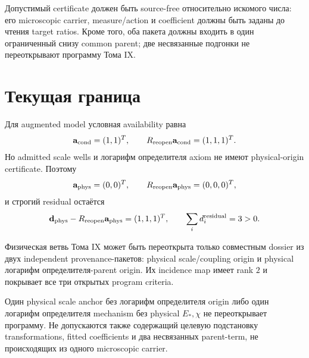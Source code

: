 Допустимый certificate должен быть source-free относительно искомого
числа: его microscopic carrier, measure/action и coefficient должны быть
заданы до чтения target ratios. Кроме того, оба пакета должны входить в
один ограниченный снизу common parent; две несвязанные подгонки не переоткрывают
программу Тома IX.

\section{Текущая граница}

Для augmented model условная availability равна
\begin{equation}
 \mathbf a_{\rm cond}=(1,1)^T,
 \qquad R_{\rm reopen}\mathbf a_{\rm cond}=(1,1,1)^T.
 \label{eq:v9-reopening-conditional-availability}
\end{equation}
Но admitted scale wells и логарифм определителя axiom не имеют physical-origin
certificate. Поэтому
\begin{equation}
 \mathbf a_{\rm phys}=(0,0)^T,
 \qquad R_{\rm reopen}\mathbf a_{\rm phys}=(0,0,0)^T,
 \label{eq:v9-reopening-physical-availability}
\end{equation}
и строгий residual остаётся
\begin{equation}
 \mathbf d_{\rm phys}-R_{\rm reopen}\mathbf a_{\rm phys}
 =(1,1,1)^T,
 \qquad \sum_i d_i^{\rm residual}=3>0.
 \label{eq:v9-reopening-residual}
\end{equation}

\begin{theorem}
Физическая ветвь Тома IX может быть переоткрыта только совместным dossier
из двух independent provenance-пакетов: physical scale/coupling origin и
physical логарифм определителя-parent origin. Их incidence map имеет rank $2$ и покрывает
все три открытых program criteria.
\end{theorem}

\begin{nogocriterion}
Один physical scale anchor без логарифм определителя origin либо один логарифм определителя mechanism
без physical $E_*,\chi$ не переоткрывает программу. Не допускаются также
содержащий целевую подстановку transformations, fitted coefficients и два несвязанных
parent-term, не происходящих из одного microscopic carrier.
\end{nogocriterion}

